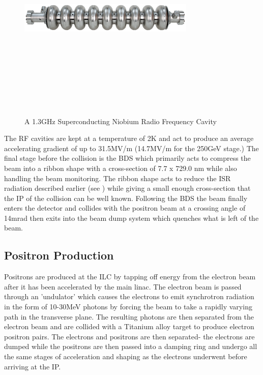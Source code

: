 \begin{figure}
  \centering
  \includegraphics[width=0.75\textwidth,height=10cm,keepaspectratio]{Experiments/fig/Cavity}
  \caption[Superconducting Cavities For The ILC]{A 1.3GHz Superconducting Niobium Radio Frequency Cavity \cite{ILCTDR}}
  \label{Fig:cavity}
\end{figure}
The \ac{RF} cavities are kept at a temperature of 2K and act to produce an average accelerating gradient of up to 31.5MV/m (14.7MV/m for the 250GeV stage.)  The final stage before the collision is the \ac{BDS} which primarily acts to compress the beam into a ribbon shape with a cross-section of 7.7 x 729.0 nm while also handling the beam monitoring. The ribbon shape acts to reduce the \ac{ISR} radiation described earlier (see ) while giving a small enough cross-section that the \ac{IP} of the collision can be well known. Following the \ac{BDS} the beam finally enters the detector and collides with the positron beam at a crossing angle of 14mrad then exits into the beam dump system which quenches what is left of the beam.
\subsection{Positron Production}
Positrons are produced at the \ac{ILC} by tapping off energy from the electron beam after it has been accelerated by the main linac. The electron beam is passed through an 'undulator' which causes the electrons to emit synchrotron radiation in the form of 10-30MeV photons by forcing the beam to take a rapidly varying path in the transverse plane. The resulting photons are then separated from the electron beam and are collided with a Titanium alloy target to produce electron positron pairs. The electrons and positrons are then separated- the electrons are dumped while the positrons are then passed into a damping ring and undergo all the same stages of acceleration and shaping as the electrons underwent before arriving at the \ac{IP}.
